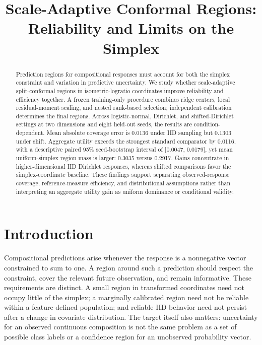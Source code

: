 \documentclass{article}
\title{Scale-Adaptive Conformal Regions:\\Reliability and Limits on the Simplex}
\author{}
\begin{document}
\maketitle

\begin{abstract}
Prediction regions for compositional responses must account for both the simplex constraint and variation in predictive uncertainty. We study whether scale-adaptive split-conformal regions in isometric-logratio coordinates improve reliability and efficiency together. A frozen training-only procedure combines ridge centers, local residual-moment scaling, and nested rank-based selection; independent calibration determines the final regions. Across logistic-normal, Dirichlet, and shifted-Dirichlet settings at two dimensions and eight held-out seeds, the results are condition-dependent. Mean absolute coverage error is 0.0136 under IID sampling but 0.1303 under shift. Aggregate utility exceeds the strongest standard comparator by 0.0116, with a descriptive paired 95\% seed-bootstrap interval of [0.0047, 0.0179], yet mean uniform-simplex region mass is larger: 0.3035 versus 0.2917. Gains concentrate in higher-dimensional IID Dirichlet responses, whereas shifted comparisons favor the simplex-coordinate baseline. These findings support separating observed-response coverage, reference-measure efficiency, and distributional assumptions rather than interpreting an aggregate utility gain as uniform dominance or conditional validity.
\end{abstract}

\section{Introduction}
Compositional predictions arise whenever the response is a nonnegative vector constrained to sum to one. A region around such a prediction should respect the constraint, cover the relevant future observation, and remain informative. These requirements are distinct. A small region in transformed coordinates need not occupy little of the simplex; a marginally calibrated region need not be reliable within a feature-defined population; and reliable IID behavior need not persist after a change in covariate distribution. The target itself also matters: uncertainty for an observed continuous composition is not the same problem as a set of possible class labels or a confidence region for an unobserved probability vector.
\end{document}
